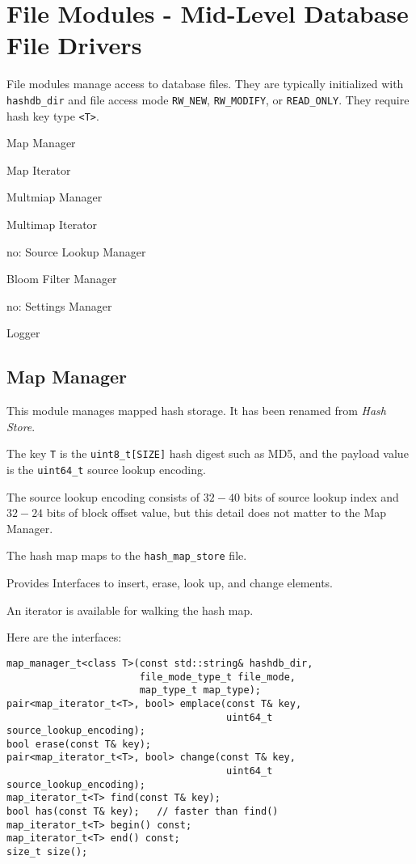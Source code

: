 \documentclass[12pt,twoside]{article}
\begin{document}
\section{File Modules - Mid-Level Database File Drivers}
File modules manage access to database files.
They are typically initialized with \texttt{hashdb\_dir} and file access mode
\texttt{RW\_NEW}, \texttt{RW\_MODIFY}, or \texttt{READ\_ONLY}.
They require hash key type \texttt{<T>}.

\begin{compactitem}
\item Map Manager
\item Map Iterator
\item Multmiap Manager
\item Multimap Iterator
\item no: Source Lookup Manager
\item Bloom Filter Manager
\item no: Settings Manager
\item Logger
\end{compactitem}

\subsection{Map Manager}
This module manages mapped hash storage.
It has been renamed from \textit{Hash Store}.
\begin{compactitem}
\item The key \texttt{T} is the \texttt{uint8\_t[SIZE]} hash digest such as MD5,
and the payload value is the \texttt{uint64\_t} source lookup encoding.
\item The source lookup encoding consists of $32-40$ bits
of source lookup index and $32-24$ bits of block offset value,
but this detail does not matter to the Map Manager.
\item The hash map maps to the \texttt{hash\_map\_store} file.
\item Provides Interfaces to insert, erase, look up, and change elements.
\item An iterator is available for walking the hash map.
\end{compactitem}

Here are the interfaces:
\begin{small}
\begin{verbatim}
map_manager_t<class T>(const std::string& hashdb_dir,
                       file_mode_type_t file_mode,
                       map_type_t map_type);
pair<map_iterator_t<T>, bool> emplace(const T& key,
                                      uint64_t source_lookup_encoding);
bool erase(const T& key);
pair<map_iterator_t<T>, bool> change(const T& key,
                                      uint64_t source_lookup_encoding);
map_iterator_t<T> find(const T& key);
bool has(const T& key);   // faster than find()
map_iterator_t<T> begin() const;
map_iterator_t<T> end() const;
size_t size();
\end{verbatim}
\end{small}
\end{document}
